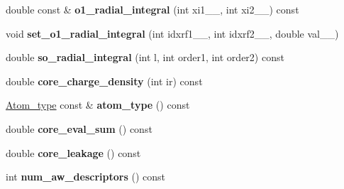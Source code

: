 \begin{DoxyCompactItemize}
\item 
\hypertarget{classsirius_1_1_atom__symmetry__class_a66c67e212b40f1519297317c2354f746}{}double const \& {\bfseries o1\+\_\+radial\+\_\+integral} (int xi1\+\_\+\+\_\+, int xi2\+\_\+\+\_\+) const \label{classsirius_1_1_atom__symmetry__class_a66c67e212b40f1519297317c2354f746}

\item 
\hypertarget{classsirius_1_1_atom__symmetry__class_aa3a240a45b6016f2d3663b6fa41a207c}{}void {\bfseries set\+\_\+o1\+\_\+radial\+\_\+integral} (int idxrf1\+\_\+\+\_\+, int idxrf2\+\_\+\+\_\+, double val\+\_\+\+\_\+)\label{classsirius_1_1_atom__symmetry__class_aa3a240a45b6016f2d3663b6fa41a207c}

\item 
\hypertarget{classsirius_1_1_atom__symmetry__class_a6876180883d6b02c7a4c124da9a8d294}{}double {\bfseries so\+\_\+radial\+\_\+integral} (int l, int order1, int order2) const \label{classsirius_1_1_atom__symmetry__class_a6876180883d6b02c7a4c124da9a8d294}

\item 
\hypertarget{classsirius_1_1_atom__symmetry__class_a9b67de9349731a6f1d02d7983080933a}{}double {\bfseries core\+\_\+charge\+\_\+density} (int ir) const \label{classsirius_1_1_atom__symmetry__class_a9b67de9349731a6f1d02d7983080933a}

\item 
\hypertarget{classsirius_1_1_atom__symmetry__class_ae9dec8d0a8e6027e417d98c01cb9ac2b}{}\hyperlink{classsirius_1_1_atom__type}{Atom\+\_\+type} const \& {\bfseries atom\+\_\+type} () const \label{classsirius_1_1_atom__symmetry__class_ae9dec8d0a8e6027e417d98c01cb9ac2b}

\item 
\hypertarget{classsirius_1_1_atom__symmetry__class_a067940be836b27b06cbfa29f51179dff}{}double {\bfseries core\+\_\+eval\+\_\+sum} () const \label{classsirius_1_1_atom__symmetry__class_a067940be836b27b06cbfa29f51179dff}

\item 
\hypertarget{classsirius_1_1_atom__symmetry__class_a74e798b9f0842f55fc7b121829110005}{}double {\bfseries core\+\_\+leakage} () const \label{classsirius_1_1_atom__symmetry__class_a74e798b9f0842f55fc7b121829110005}

\item 
\hypertarget{classsirius_1_1_atom__symmetry__class_aaae366eb73fdfca21c4cbc3c92b4e8a1}{}int {\bfseries num\+\_\+aw\+\_\+descriptors} () const \label{classsirius_1_1_atom__symmetry__class_aaae366eb73fdfca21c4cbc3c92b4e8a1}


\end{DoxyCompactItemize}
